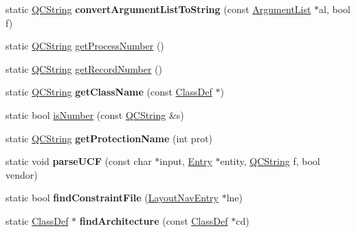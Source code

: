 \begin{DoxyCompactItemize}
\item 
\hypertarget{class_vhdl_doc_gen_a3bb091b1aa64af5cc98c4e3cdb56a6a0}{static \hyperlink{class_q_c_string}{Q\-C\-String} {\bfseries convert\-Argument\-List\-To\-String} (const \hyperlink{class_argument_list}{Argument\-List} $\ast$al, bool f)}\label{class_vhdl_doc_gen_a3bb091b1aa64af5cc98c4e3cdb56a6a0}

\item 
static \hyperlink{class_q_c_string}{Q\-C\-String} \hyperlink{class_vhdl_doc_gen_a518eb84d22b09c7cee4e11ea55ba5ee5}{get\-Process\-Number} ()
\item 
static \hyperlink{class_q_c_string}{Q\-C\-String} \hyperlink{class_vhdl_doc_gen_a9a7fdba7cc550c0e88f4d3a12db4808c}{get\-Record\-Number} ()
\item 
\hypertarget{class_vhdl_doc_gen_a1254e534fa096e9d461e160fc73a88c0}{static \hyperlink{class_q_c_string}{Q\-C\-String} {\bfseries get\-Class\-Name} (const \hyperlink{class_class_def}{Class\-Def} $\ast$)}\label{class_vhdl_doc_gen_a1254e534fa096e9d461e160fc73a88c0}

\item 
static bool \hyperlink{class_vhdl_doc_gen_a8c29fa167190411b4bdf3440c9cc71cd}{is\-Number} (const \hyperlink{class_q_c_string}{Q\-C\-String} \&s)
\item 
\hypertarget{class_vhdl_doc_gen_a8bd29e244534d299615fa6f85ae26518}{static \hyperlink{class_q_c_string}{Q\-C\-String} {\bfseries get\-Protection\-Name} (int prot)}\label{class_vhdl_doc_gen_a8bd29e244534d299615fa6f85ae26518}

\item 
\hypertarget{class_vhdl_doc_gen_a0177773ba434a06b2964a1dc59780c4a}{static void {\bfseries parse\-U\-C\-F} (const char $\ast$input, \hyperlink{class_entry}{Entry} $\ast$entity, \hyperlink{class_q_c_string}{Q\-C\-String} f, bool vendor)}\label{class_vhdl_doc_gen_a0177773ba434a06b2964a1dc59780c4a}

\item 
\hypertarget{class_vhdl_doc_gen_ad907e0459c4156bca2a10fa4d8c492f3}{static bool {\bfseries find\-Constraint\-File} (\hyperlink{struct_layout_nav_entry}{Layout\-Nav\-Entry} $\ast$lne)}\label{class_vhdl_doc_gen_ad907e0459c4156bca2a10fa4d8c492f3}

\item 
\hypertarget{class_vhdl_doc_gen_a76e6881560dc632ffb731268166138b2}{static \hyperlink{class_class_def}{Class\-Def} $\ast$ {\bfseries find\-Architecture} (const \hyperlink{class_class_def}{Class\-Def} $\ast$cd)}\label{class_vhdl_doc_gen_a76e6881560dc632ffb731268166138b2}


\end{DoxyCompactItemize}
